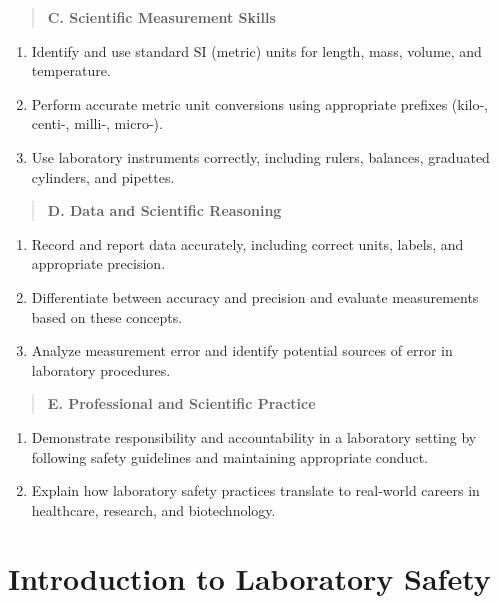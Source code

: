 \documentclass[
  letterpaper,
  DIV=11,
  numbers=noendperiod]{scrreprt}
\begin{document}
\begin{quote}
\textbf{C. Scientific Measurement Skills}
\end{quote}

\begin{enumerate}
\def\labelenumi{\arabic{enumi}.}
\item
  Identify and use standard SI (metric) units for length, mass, volume,
  and temperature.
\item
  Perform accurate metric unit conversions using appropriate prefixes
  (kilo-, centi-, milli-, micro-).
\item
  Use laboratory instruments correctly, including rulers, balances,
  graduated cylinders, and pipettes.
\end{enumerate}

\begin{quote}
\textbf{D. Data and Scientific Reasoning}
\end{quote}

\begin{enumerate}
\def\labelenumi{\arabic{enumi}.}
\item
  Record and report data accurately, including correct units, labels,
  and appropriate precision.
\item
  Differentiate between accuracy and precision and evaluate measurements
  based on these concepts.
\item
  Analyze measurement error and identify potential sources of error in
  laboratory procedures.
\end{enumerate}

\begin{quote}
\textbf{E. Professional and Scientific Practice}
\end{quote}

\begin{enumerate}
\def\labelenumi{\arabic{enumi}.}
\item
  Demonstrate responsibility and accountability in a laboratory setting
  by following safety guidelines and maintaining appropriate conduct.
\item
  Explain how laboratory safety practices translate to real-world
  careers in healthcare, research, and biotechnology.
\end{enumerate}

\section{\texorpdfstring{\textbf{Introduction to Laboratory
Safety}}{Introduction to Laboratory Safety}}\label{introduction-to-laboratory-safety}
\end{document}
